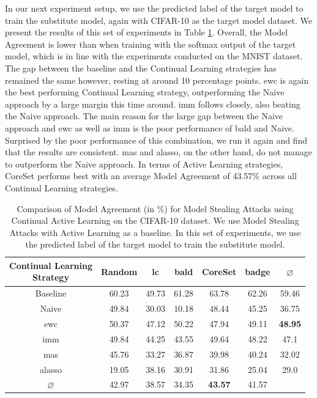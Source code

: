 In our next experiment setup, we use the predicted label of the target model to train the substitute model, again with CIFAR-10 as the target model dataset. We present the results of this set of experiments in Table \ref{fig:ModelStealingCIFAR10Label}. Overall,
the Model Agreement is lower than when training with the softmax output of the target model, which is in line with the experiments conducted on the MNIST dataset. The gap between the baseline and the Continual Learning strategies has remained the same however,
resting at around 10 percentage points. \gls{ewc} is again the best performing Continual Learning strategy, outperforming the Naive approach by a large margin this time around. \gls{imm} follows closely, also beating the Naive approach. The main reason for the large gap
between the Naive approach and \gls{ewc} as well as \gls{imm} is the poor performance of \gls{bald} and Naive. Surprised by the poor performance of this combination, we run it again and find that the results are consistent. \gls{mas} and \gls{alasso}, on the other hand, do not manage to
outperform the Naive approach. In terms of Active Learning strategies, CoreSet performs best with an average Model Agreement of 43.57\% across all Continual Learning strategies. \par

\begin{table}[h]
    \centering
    \begin{tabular}{c | c c c c c | c} 
        \hline
        \diagbox[width=11em]{Active \\ Learning Strategy}{Continual Learning \\ Strategy} & Random & \gls{lc} & \gls{bald} & CoreSet & \gls{badge} & $\varnothing$\\ 
        \hline 
        Baseline & 60.23 & 49.73 & 61.28 & 63.78 & 62.26 & 59.46\\
        \hline
        Naive & 49.84 & 30.03 & 10.18 & 48.44 & 45.25 & 36.75\\
        \gls{ewc} & 50.37 & 47.12 & 50.22 & 47.94 & 49.11 & \textbf{48.95} \\
        \gls{imm} & 49.84 & 44.25 & 43.55 & 49.64 & 48.22 & 47.1\\
        \gls{mas} & 45.76 & 33.27 & 36.87 & 39.98 & 40.24 & 32.02\\
        \gls{alasso} & 19.05 & 38.16 & 30.91 & 31.86 & 25.04 & 29.0\\
        \hline
        $\varnothing$ & 42.97 & 38.57 & 34.35 & \textbf{43.57} & 41.57\\
        \hline
    \end{tabular}
    \caption[Model agreement of Continual Learning strategies on CIFAR-10 using the predicted class label]{Comparison of Model Agreement (in \%) for Model Stealing Attacks using Continual Active Learning on the CIFAR-10 dataset. We use Model Stealing Attacks with Active
    Learning as a baseline. In this set of experiments, we use the predicted label of the target model to train the substitute model.}
    \label{fig:ModelStealingCIFAR10Label}
\end{table}

